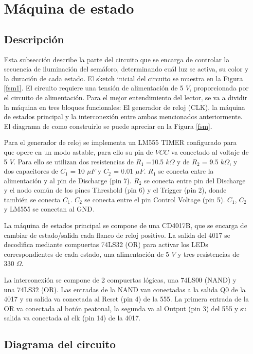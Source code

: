 \documentclass[12pt, journal, onecolumn]{IEEEtran}
\begin{document}
\section{Máquina de estado}
\subsection{Descripción}
Esta subsección describe la parte del circuito que se encarga de controlar la secuencia de iluminación del semáforo, determinando cuál luz se activa, su color y la duración de cada estado. El sketch inicial del circuito se muestra en la Figura \ref{fsm1}. El circuito requiere una tensión de alimentación de 5 $V$, proporcionada por el circuito de alimentación. Para el mejor entendimiento del lector, se va a dividir la máquina en tres bloques funcionales: El generador de reloj (CLK), la máquina de estados principal y la interconexión entre ambos mencionados anteriormente. El diagrama de como construirlo se puede apreciar en la Figura \ref{fsm}.

Para el generador de reloj se implementa un LM555 TIMER configurado para que opere en un modo astable, para ello su pin de $VCC$ va conectado al voltaje de 5 $V$. Para ello se utilizan dos resistencias de $R_1$ =10.5 $k \Omega$ y de $R_2$ = 9.5 $k \Omega$, y dos capacitores de $C_1$ = 10 $\mu F$ y $C_2$ = 0.01 $\mu F$.  $R_1$ se conecta entre la alimentación y al pin de Discharge (pin 7). $R_2$ se conecta entre pin del Discharge y el nodo común de los pines Threshold (pin 6) y el Trigger (pin 2), donde también se conecta $C_1$. $C_2$ se conecta entre el pin Control Voltage (pin 5). $C_1$, $C_2$ y LM555 se conectan al GND.

La máquina de estados principal se compone de una CD4017B, que se encarga de cambiar de estado/salida cada flanco de reloj positivo. La salida del 4017 se decodifica mediante compuertas 74LS32 (OR) para activar los LEDs correspondientes de cada estado, una alimentación de 5 $V$ y tres resistencias de 330 $\Omega$.

La interconexión se compone de 2 compuertas lógicas, una 74LS00 (NAND) y una 74LS32 (OR). Las entradas de la NAND van conectadas a la salida Q0 de la 4017 y su salida va conectada al Reset (pin 4) de la 555. La primera entrada de la OR va conectada al botón peatonal, la segunda va al Output (pin 3) del 555  y su salida va conectada al clk (pin 14) de la 4017. 

\subsection{Diagrama del circuito}
	
\end{document}
